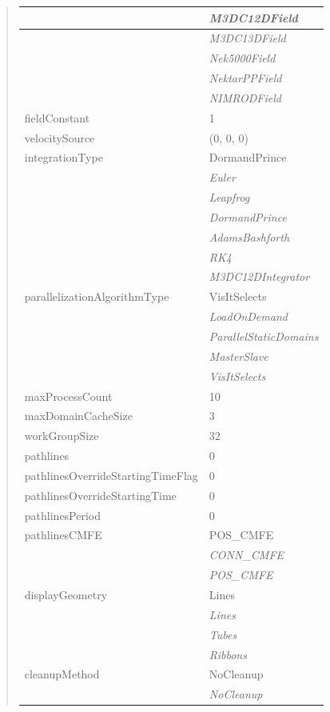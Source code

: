 \documentclass[letterpaper,10pt,english]{sphinxmanual}
\begin{document}
\begin{quote}
\begin{longtable}{|l|l|}
\\
\hline & 
\emph{M3DC12DField}
\\
\hline & 
\emph{M3DC13DField}
\\
\hline & 
\emph{Nek5000Field}
\\
\hline & 
\emph{NektarPPField}
\\
\hline & 
\emph{NIMRODField}
\\
\hline
fieldConstant
 & 
1
\\
\hline
velocitySource
 & 
(0, 0, 0)
\\
\hline
integrationType
 & 
DormandPrince
\\
\hline & 
\emph{Euler}
\\
\hline & 
\emph{Leapfrog}
\\
\hline & 
\emph{DormandPrince}
\\
\hline & 
\emph{AdamsBashforth}
\\
\hline & 
\emph{RK4}
\\
\hline & 
\emph{M3DC12DIntegrator}
\\
\hline
parallelizationAlgorithmType
 & 
VisItSelects
\\
\hline & 
\emph{LoadOnDemand}
\\
\hline & 
\emph{ParallelStaticDomains}
\\
\hline & 
\emph{MasterSlave}
\\
\hline & 
\emph{VisItSelects}
\\
\hline
maxProcessCount
 & 
10
\\
\hline
maxDomainCacheSize
 & 
3
\\
\hline
workGroupSize
 & 
32
\\
\hline
pathlines
 & 
0
\\
\hline
pathlinesOverrideStartingTimeFlag
 & 
0
\\
\hline
pathlinesOverrideStartingTime
 & 
0
\\
\hline
pathlinesPeriod
 & 
0
\\
\hline
pathlinesCMFE
 & 
POS\_CMFE
\\
\hline & 
\emph{CONN\_CMFE}
\\
\hline & 
\emph{POS\_CMFE}
\\
\hline
displayGeometry
 & 
Lines
\\
\hline & 
\emph{Lines}
\\
\hline & 
\emph{Tubes}
\\
\hline & 
\emph{Ribbons}
\\
\hline
cleanupMethod
 & 
NoCleanup
\\
\hline & 
\emph{NoCleanup}
\\

\end{longtable}
\end{quote}
\end{document}
